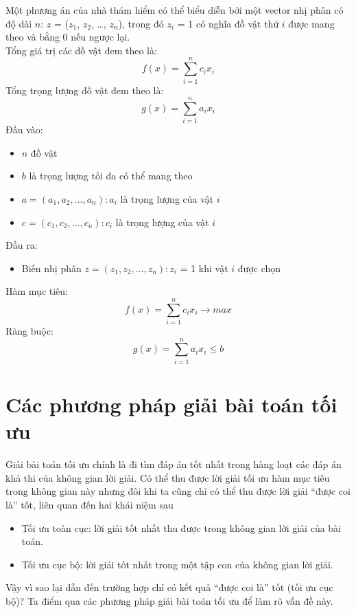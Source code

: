 Một phương án của nhà thám hiểm có thể biểu diễn bởi một vector nhị phân có độ dài $n$: $z$ = ($z_1$, $z_2$, …, $z_n$), trong đó $z_i$ = 1 có nghĩa đồ vật thứ $i$ được mang theo và bằng 0 nếu ngược lại. 
\\Tổng giá trị các đồ vật đem theo là:
\begin{equation}
    f(x) = \sum_{i=1}^{n}c_ix_i
\end{equation}
Tổng trọng lượng đồ vật đem theo là:
\begin{equation}
    g(x) = \sum_{i=1}^{n}a_ix_i
\end{equation}
Đầu vào:
\begin{itemize}
    \item $n$ đồ vật 
    \item $b$ là trọng lượng tối đa có thể mang theo 
    \item $a = (a_1, a_2, ..., a_n): a_i$ là trọng lượng của vật $i$
    \item $c = (c_1, c_2, ..., c_n): c_i$ là trọng lượng của vật $i$
\end{itemize}
Đầu ra: 
\begin{itemize}
    \item Biến nhị phân $z = (z_1, z_2, ..., z_n): z_i$ = 1 khi vật $i$ được chọn 
\end{itemize}
Hàm mục tiêu: 
\begin{equation}
        f(x) = \sum_{i=1}^{n}c_ix_i \rightarrow max 
\end{equation}
Ràng buộc:
\begin{equation}
        g(x) = \sum_{i=1}^{n}a_ix_i \leq b 
    \end{equation}
\section{Các phương pháp giải bài toán tối ưu}
Giải bài toán tối ưu chính là đi tìm đáp án tốt nhất trong hàng loạt các đáp án khả thi của không gian lời giải. Có thể thu được lời giải tối ưu hàm mục tiêu trong không gian này nhưng đôi khi ta cũng chỉ có thể thu được lời giải “được coi là” tốt, liên quan đến hai khái niệm sau
\begin{itemize}
	\item Tối ưu toàn cục: lời giải tốt nhất thu được trong không gian lời giải của bài toán.
	\item Tối ưu cục bộ: lời giải tốt nhất trong một tập con của không gian lời giải.
\end{itemize}
Vậy vì sao lại dẫn đến trường hợp chỉ có kết quả “được coi là” tốt (tối ưu cục bộ)? Ta điểm qua các phương pháp giải bài toán tối ưu để làm rõ vấn đề này.
